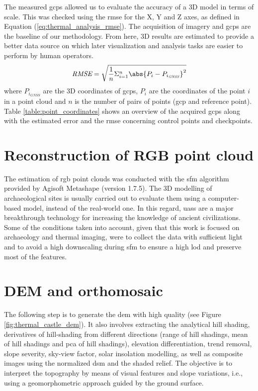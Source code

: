 The measured \acrshort{gcp}s allowed us to evaluate the accuracy of a 3D model in terms of scale. This was checked using the \acrshort{rmse} for the X, Y and Z axes, as defined in Equation (\ref{eq:thermal_analysis_rmse}). The acquisition of imagery and \acrshort{gcp}s are the baseline of our methodology. From here, 3D results are estimated to provide a better data source on which later visualization and analysis tasks are easier to perform by human operators.
\begin{equation}
\label{eq:thermal_analysis_rmse}
\textit{RMSE} = \sqrt{\frac{1}{n}\Sigma_{i=1}^{n}{\abs{P_{i} - P_{{i_{\textit{GNSS}}}}}^2}}
\end{equation}
where $P_{i_{\textit{GNSS}}}$ are the 3D coordinates of \acrshort{gcp}s, $P_{i}$ are the coordinates of the point $i$ in a point cloud and $n$ is the number of pairs of points (\acrshort{gcp} and reference point). Table \ref{table:point_coordinates} shows an overview of the acquired \acrshort{gcp}s along with the estimated error and the \acrshort{rmse} concerning control points and checkpoints.

\section{Reconstruction of RGB point cloud}

The estimation of \acrshort{rgb} point clouds was conducted with the \acrshort{sfm} algorithm provided by Agisoft Metashape\textregistered \hspace{1mm} (version 1.7.5). The 3D modelling of archaeological sites is usually carried out to evaluate them using a computer-based model, instead of the real-world one. In this regard, \acrshort{uas}s are a major breakthrough technology for increasing the knowledge of ancient civilizations. Some of the conditions taken into account, given that this work is focused on archaeology and thermal imaging, were to collect the data with sufficient light and to avoid a high downscaling during \acrshort{sfm} to ensure a high \acrshort{lod} and preserve most of the features.

\section{DEM and orthomosaic}

The following step is to generate the \acrshort{dem} with high quality (see Figure \ref{fig:thermal_castle_dem}). It also involves extracting the analytical hill shading, derivatives of hill-shading from different directions (range of hill shadings, mean of hill shadings and \acrshort{pca} of hill shadings), elevation differentiation, trend removal, slope severity, sky-view factor, solar insolation modelling, as well as composite images using the normalized \acrshort{dsm} and the shaded relief. The objective is to interpret the topography by means of visual features and slope variations, i.e., using a geomorphometric approach guided by the ground surface. 

